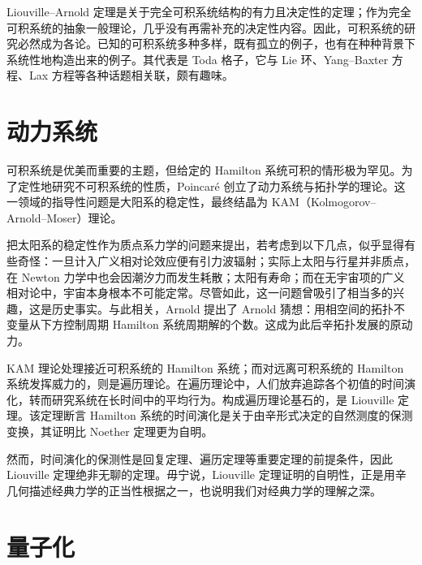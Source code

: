 
Liouville–Arnold 定理是关于完全可积系统结构的有力且决定性的定理；作为完全可积系统的抽象一般理论，几乎没有再需补充的决定性内容。因此，可积系统的研究必然成为各论。已知的可积系统多种多样，既有孤立的例子，也有在种种背景下系统性地构造出来的例子。其代表是 Toda 格子，它与 Lie 环、Yang–Baxter 方程、Lax 方程等各种话题相关联，颇有趣味。


\section{动力系统}

可积系统是优美而重要的主题，但给定的 Hamilton 系统可积的情形极为罕见。为了定性地研究不可积系统的性质，Poincaré 创立了动力系统与拓扑学的理论。这一领域的指导性问题是大阳系的稳定性，最终结晶为 KAM（Kolmogorov–Arnold–Moser）理论。

把太阳系的稳定性作为质点系力学的问题来提出，若考虑到以下几点，似乎显得有些奇怪：一旦计入广义相对论效应便有引力波辐射；实际上太阳与行星并非质点，在 Newton 力学中也会因潮汐力而发生耗散；太阳有寿命；而在无宇宙项的广义相对论中，宇宙本身根本不可能定常。尽管如此，这一问题曾吸引了相当多的兴趣，这是历史事实。与此相关，Arnold 提出了 Arnold 猜想：用相空间的拓扑不变量从下方控制周期 Hamilton 系统周期解的个数。这成为此后辛拓扑发展的原动力。

KAM 理论处理接近可积系统的 Hamilton 系统；而对远离可积系统的 Hamilton 系统发挥威力的，则是遍历理论。在遍历理论中，人们放弃追踪各个初值的时间演化，转而研究系统在长时间中的平均行为。构成遍历理论基石的，是 Liouville 定理。该定理断言 Hamilton 系统的时间演化是关于由辛形式决定的自然测度的保测变换，其证明比 Noether 定理更为自明。

然而，时间演化的保测性是回复定理、遍历定理等重要定理的前提条件，因此 Liouville 定理绝非无聊的定理。毋宁说，Liouville 定理证明的自明性，正是用辛几何描述经典力学的正当性根据之一，也说明我们对经典力学的理解之深。


\section{量子化}

